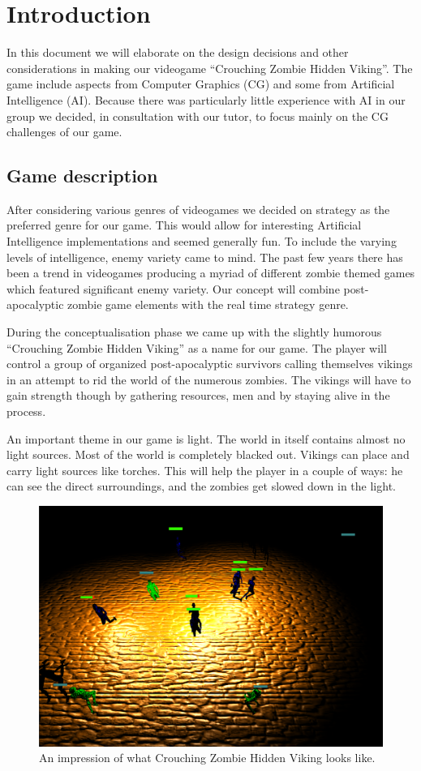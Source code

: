 \chapter{Introduction}
In this document we will elaborate on the design decisions and other considerations in making our videogame ``Crouching Zombie Hidden Viking''. The game include aspects from Computer Graphics (CG) and some from Artificial Intelligence (AI). Because there was particularly little experience with AI in our group we decided, in consultation with our tutor, to focus mainly on the CG challenges of our game.

\section{Game description}
After considering various genres of videogames we decided on strategy as the preferred genre for our game. This would allow for interesting Artificial Intelligence implementations and seemed generally fun. To include the varying levels of intelligence, enemy variety came to mind. The past few years there has been a trend in videogames producing a myriad of different zombie themed games which featured significant enemy variety. Our concept will combine post-apocalyptic zombie game  elements with the real time strategy genre.

During the conceptualisation phase we came up with the slightly humorous ``Crouching Zombie Hidden Viking'' as a name for our game. The player will control a group of organized post-apocalyptic survivors calling themselves vikings in an attempt to rid the world of the numerous zombies. The vikings will have to gain strength though by gathering resources, men and by staying alive in the process.

An important theme in our game is light. The world in itself contains almost no light sources. Most of the world is completely blacked out. Vikings can place and carry light sources like torches. This will help the player in a couple of ways: he can see the direct surroundings, and the zombies get slowed down in the light.

\begin{figure}[!htb]
	\centering
	\includegraphics[width=\textwidth]{czhv.png}
	\caption{An impression of what Crouching Zombie Hidden Viking looks like.}
\end{figure}

\FloatBarrier